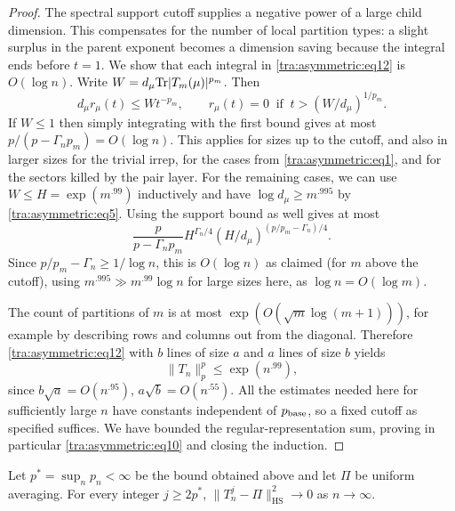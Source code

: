 \begin{proof}
The spectral support cutoff supplies a negative power of a large child
dimension. This compensates for the number of local partition types:
a slight surplus in the parent exponent becomes a dimension saving
because the integral ends before $t=1$. We show that each integral
in \eqref{tra:asymmetric:eq12} is $O(\log n)$. Write \(W=d_\mu {\rm Tr}|T_m(\mu)|^{p_m}\). Then
\[
         d_\mu r_\mu(t)\le W t^{-p_m},\qquad
         r_\mu(t)=0\ \text{ if }\ t>(W/d_\mu)^{1/p_m}.
\]
If \(W\le1\) then simply integrating with the first bound gives at most \(p/(p-\Gamma_n p_m)=O(\log n)\). This applies for sizes up to the cutoff, and also in larger sizes for the trivial irrep, for the cases from \eqref{tra:asymmetric:eq1}, and for the sectors killed by the pair layer. For the remaining cases, we can use \(W\le H=\exp(m^{.99})\) inductively and have \(\log d_\mu\ge m^{.995}\) by \eqref{tra:asymmetric:eq5}. Using the support bound as well gives at most
\[
          \frac{p}{p-\Gamma_n p_m}
                   H^{\Gamma_n/4} (H/d_\mu)^{(p/p_m-\Gamma_n)/4}.
\]
Since \(p/p_m-\Gamma_n\ge 1/\log n\), this is \(O(\log n)\) as claimed (for \(m\) above the cutoff), using \(m^{.995}\gg m^{.99}\log n\) for large sizes here, as \(\log n=O(\log m)\).

The count of partitions of \(m\) is at most \(\exp(O(\sqrt m\log(m+1)))\), for example by describing rows and columns out from the diagonal. Therefore \eqref{tra:asymmetric:eq12} with \(b\) lines of size \(a\) and \(a\) lines of size \(b\) yields
\[
                              \|T_n\|_p^p\le \exp(n^{.99}),
\]
since \(b\sqrt{a}=O(n^{.95})\), \(a\sqrt{b}=O(n^{.55})\). All the estimates needed here for sufficiently large \(n\) have constants independent of \(p_{\rm base}\), so a fixed cutoff as specified suffices. We have bounded the regular-representation sum, proving in particular \eqref{tra:asymmetric:eq10} and closing the induction.
\end{proof}
\begin{corollary}\label{tra:asymmetric:mixing}
Let $p^*=\sup_n p_n<\infty$ be the bound obtained above and let
$\Pi$ be uniform averaging. For every integer $j\ge2p^*$,
$\|T_n^j-\Pi\|_{\mathrm{HS}}^2\longrightarrow0$ as $n\to\infty$.
\end{corollary}
